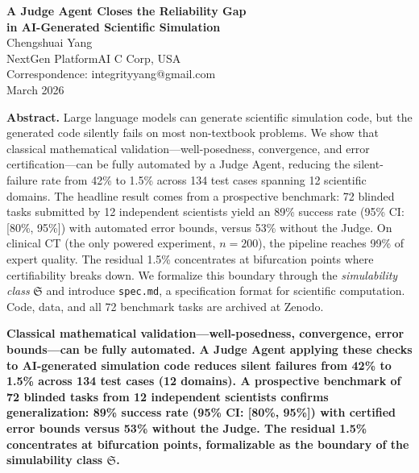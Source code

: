 \documentclass[11pt,a4paper]{article}
\newcommand{\Sclass}{\mathfrak{S}}
\begin{document}
\begin{center}
{\LARGE\bfseries A Judge Agent Closes the Reliability Gap\\[3pt]
in AI-Generated Scientific Simulation}\\[18pt]
{\large Chengshuai Yang}\\[6pt]
{\normalsize NextGen PlatformAI C Corp, USA}\\[6pt]
{\normalsize Correspondence: integrityyang@gmail.com}\\[12pt]
March 2026
\end{center}

\vspace{6pt}

\noindent\textbf{Abstract.}
Large language models can generate scientific simulation code, but the generated code silently fails on most non-textbook problems. We show that classical mathematical validation---well-posedness, convergence, and error certification---can be fully automated by a Judge Agent, reducing the silent-failure rate from 42\% to 1.5\% across 134 test cases spanning 12 scientific domains. The headline result comes from a prospective benchmark: 72 blinded tasks submitted by 12 independent scientists yield an 89\% success rate (95\% CI: [80\%, 95\%]) with automated error bounds, versus 53\% without the Judge. On clinical CT (the only powered experiment, $n = 200$), the pipeline reaches 99\% of expert quality. The residual 1.5\% concentrates at bifurcation points where certifiability breaks down. We formalize this boundary through the \emph{simulability class} $\Sclass$ and introduce \texttt{spec.md}, a specification format for scientific computation. Code, data, and all 72 benchmark tasks are archived at Zenodo.


\textbf{Classical mathematical validation---well-posedness, convergence, error bounds---can be fully automated. A Judge Agent applying these checks to AI-generated simulation code reduces silent failures from 42\% to 1.5\% across 134 test cases (12 domains). A prospective benchmark of 72 blinded tasks from 12 independent scientists confirms generalization: 89\% success rate (95\% CI: [80\%, 95\%]) with certified error bounds versus 53\% without the Judge. The residual 1.5\% concentrates at bifurcation points, formalizable as the boundary of the simulability class $\Sclass$.}
\end{document}
